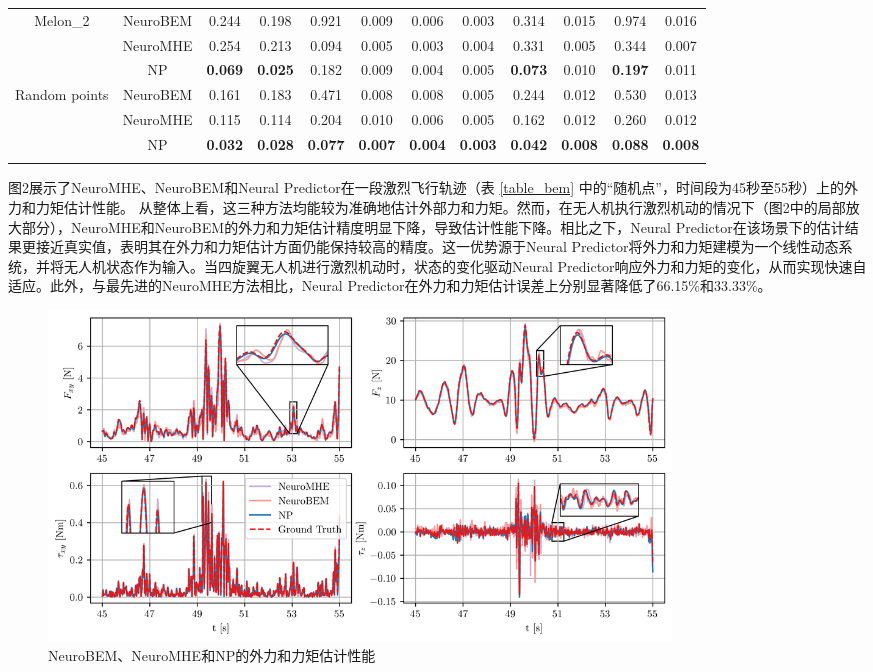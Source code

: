 \documentclass[lang=chs, degree=master, blindreview=false, winfonts=true]{yanputhesis}
\begin{document}
\begin{table}[h]
\begin{tabular}{c c c c c c c c c c c c}
	\hline
	\multirow{3}{*}{Melon\_2} & NeuroBEM & 0.244 & 0.198 & 0.921 & 0.009 & 0.006 & 0.003 & 0.314 & 0.015 & 0.974 & 0.016 \\
	& NeuroMHE & 0.254 & 0.213 & 0.094 & 0.005 & 0.003 & 0.004 & 0.331 & 0.005 & 0.344 & 0.007 \\
	& NP & \textbf{0.069} & \textbf{0.025} & 0.182 & 0.009 & 0.004 & 0.005 & \textbf{0.073} & 0.010 & \textbf{0.197} & 0.011 \\
	\hline
	\multirow{3}{*}{Random points} & NeuroBEM & 0.161 & 0.183 & 0.471 & 0.008 & 0.008 & 0.005 & 0.244 & 0.012 & 0.530 & 0.013 \\
	& NeuroMHE & 0.115 & 0.114 & 0.204 & 0.010 & 0.006 & 0.005 & 0.162 & 0.012 & 0.260 & 0.012 \\
	& NP & \textbf{0.032} & \textbf{0.028} & \textbf{0.077} & \textbf{0.007} & \textbf{0.004} & \textbf{0.003} & \textbf{0.042} & \textbf{0.008} & \textbf{0.088} & \textbf{0.008} \\
	\Xhline{1.pt}
\end{tabular}
\end{table}

图2展示了NeuroMHE、NeuroBEM和Neural Predictor在一段激烈飞行轨迹（表 \ref{table_bem} 中的“随机点”，时间段为45秒至55秒）上的外力和力矩估计性能。
从整体上看，这三种方法均能较为准确地估计外部力和力矩。然而，在无人机执行激烈机动的情况下（图2中的局部放大部分），NeuroMHE和NeuroBEM的外力和力矩估计精度明显下降，导致估计性能下降。相比之下，Neural Predictor在该场景下的估计结果更接近真实值，表明其在外力和力矩估计方面仍能保持较高的精度。这一优势源于Neural Predictor将外力和力矩建模为一个线性动态系统，并将无人机状态作为输入。当四旋翼无人机进行激烈机动时，状态的变化驱动Neural Predictor响应外力和力矩的变化，从而实现快速自适应。此外，与最先进的NeuroMHE方法相比，Neural Predictor在外力和力矩估计误差上分别显著降低了66.15\%和33.33\%。

\begin{figure}[hbt!]
	\hspace{-0.6cm}  %
	\centering
	\includegraphics[width=39pc]{picture/bem_comparison.png} 
	\caption{NeuroBEM、NeuroMHE和NP的外力和力矩估计性能} 
	\label{3-5}
\end{figure}
\end{document}
